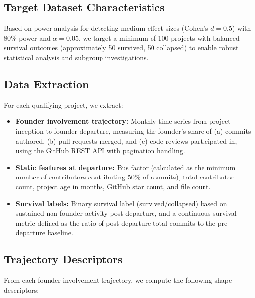 \documentclass[11pt,letterpaper]{article}
\begin{document}
\subsection{Target Dataset Characteristics}

Based on power analysis for detecting medium effect sizes (Cohen's $d = 0.5$) with 80\% power and $\alpha = 0.05$, we target a minimum of 100 projects with balanced survival outcomes (approximately 50 survived, 50 collapsed) to enable robust statistical analysis and subgroup investigations.

\subsection{Data Extraction}

For each qualifying project, we extract:

\begin{itemize}
  \item \textbf{Founder involvement trajectory:} Monthly time series from project inception to founder departure, measuring the founder's share of (a) commits authored, (b) pull requests merged, and (c) code reviews participated in, using the GitHub REST API with pagination handling.
  \item \textbf{Static features at departure:} Bus factor (calculated as the minimum number of contributors contributing 50\% of commits), total contributor count, project age in months, GitHub star count, and file count.
  \item \textbf{Survival labels:} Binary survival label (survived/collapsed) based on sustained non-founder activity post-departure, and a continuous survival metric defined as the ratio of post-departure total commits to the pre-departure baseline.
\end{itemize}

\subsection{Trajectory Descriptors}

From each founder involvement trajectory, we compute the following shape descriptors:
\end{document}

